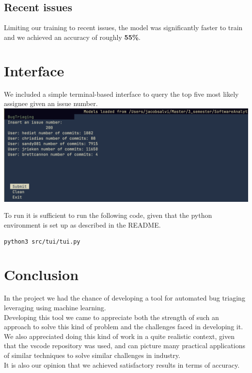 \documentclass[tikz,10pt,fleqn]{article}
\begin{document}
\subsection*{Recent issues}
Limiting our training to recent issues, the model was significantly faster to train and we achieved an accuracy of roughly \textbf{ 55\%}.

\section*{Interface}
We included a simple terminal-based interface to query the top five most likely assignee given an issue number.\\
\includegraphics[width=\textwidth]{./tui.png}

To run it is sufficient to run the following code, given that the python environment is set up as described in the README.
\begin{verbatim}
python3 src/tui/tui.py
\end{verbatim}

\section*{Conclusion}
In the project we had the chance of developing a tool for automated bug triaging leveraging using machine learning.\\
Developing this tool we came to appreciate both the strength of such an approach to solve this kind of problem and the challenges faced in developing it.\\
We also appreciated doing this kind of work in a quite realistic context, given that the vscode repository was used, and can picture many practical applications of similar techniques to solve similar challenges in industry.\\
It is also our opinion that we achieved satisfactory results in terms of accuracy.
\end{document}
